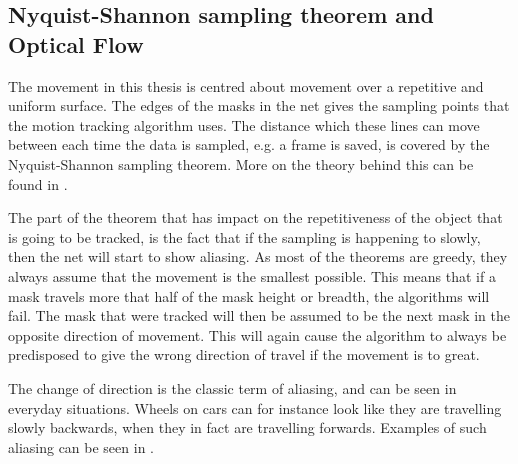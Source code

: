 \subsection{Nyquist-Shannon sampling theorem and Optical Flow}
The movement in this thesis is centred about movement over a repetitive and uniform surface. The edges of
the  masks in the net gives the sampling points that the motion tracking algorithm uses. The distance which 
these lines can move between each time the data is sampled, e.g. a frame is saved, is 
covered by the Nyquist-Shannon sampling theorem. More on the theory behind this can be found in \citet{proakis2007}. 

The part of the theorem that has impact on the repetitiveness of the object that is going to be tracked, is 
the fact that if the sampling is happening to slowly, then the net will start to show aliasing.
As most of the theorems are greedy, they always assume that the movement is the smallest possible. This means 
that if a mask travels more that half of the mask height or breadth, the algorithms will fail. The 
mask that were tracked will then be assumed to be the next mask in the opposite direction of movement. This 
will again cause the algorithm to always be predisposed to give the wrong direction of travel if the movement is to great.

The change of direction is the classic term of aliasing, and can be seen in everyday situations. Wheels on cars can for instance 
look like they are travelling slowly backwards, when they in fact are travelling forwards. Examples of such 
aliasing can be seen in \citet{proakis2007}.

